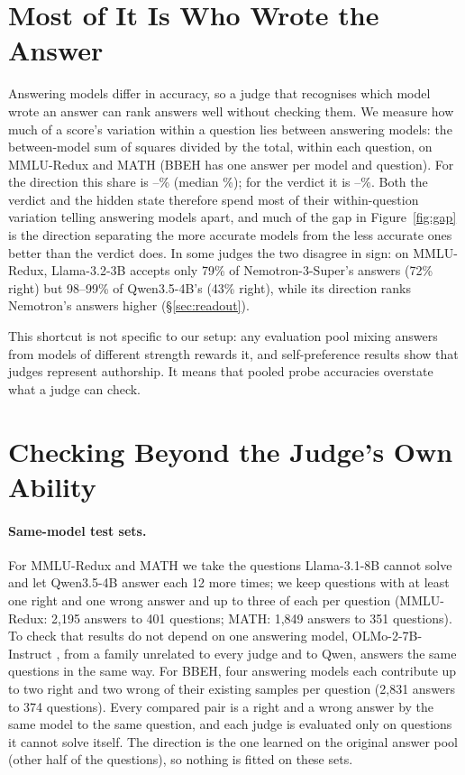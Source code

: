 \documentclass[11pt]{article}
\begin{document}
\section{Most of It Is Who Wrote the Answer}
\label{sec:author}

Answering models differ in accuracy, so a judge that recognises which model wrote an answer can rank answers well without checking them. We measure how much of a score's variation within a question lies between answering models: the between-model sum of squares divided by the total, within each question, on MMLU-Redux and MATH (BBEH has one answer per model and question). For the direction this share is --\% (median \%); for the verdict it is --\%. Both the verdict and the hidden state therefore spend most of their within-question variation telling answering models apart, and much of the gap in Figure~\ref{fig:gap} is the direction separating the more accurate models from the less accurate ones better than the verdict does. In some judges the two disagree in sign: on MMLU-Redux, Llama-3.2-3B accepts only 79\% of Nemotron-3-Super's answers (72\% right) but 98--99\% of Qwen3.5-4B's (43\% right), while its direction ranks Nemotron's answers higher (\S\ref{sec:readout}).

This shortcut is not specific to our setup: any evaluation pool mixing answers from models of different strength rewards it, and self-preference results \citep{panickssery2024llm} show that judges represent authorship. It means that pooled probe accuracies overstate what a judge can check.

\section{Checking Beyond the Judge's Own Ability}
\label{sec:beyond}

\paragraph{Same-model test sets.} For MMLU-Redux and MATH we take the questions Llama-3.1-8B cannot solve and let Qwen3.5-4B answer each 12 more times; we keep questions with at least one right and one wrong answer and up to three of each per question (MMLU-Redux: 2,195 answers to 401 questions; MATH: 1,849 answers to 351 questions). To check that results do not depend on one answering model, OLMo-2-7B-Instruct \citep{olmo2025olmo2}, from a family unrelated to every judge and to Qwen, answers the same questions in the same way. For BBEH, four answering models each contribute up to two right and two wrong of their existing samples per question (2,831 answers to 374 questions). Every compared pair is a right and a wrong answer by the same model to the same question, and each judge is evaluated only on questions it cannot solve itself. The direction is the one learned on the original answer pool (other half of the questions), so nothing is fitted on these sets.
\end{document}
